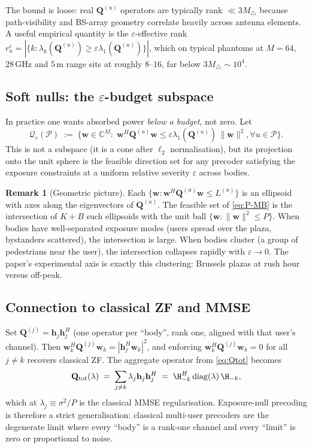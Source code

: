 \documentclass[11pt,a4paper]{article}
\theoremstyle{definition}
\newtheorem{remark}[remark]{Remark}
\newcommand{\ww}{\mathbf{w}}
\newcommand{\hh}{\mathbf{h}}
\newcommand{\Q}{\mathbf{Q}}
\newcommand{\Complex}{\mathbb{C}}
\newcommand{\Bodies}{\mathcal{P}}
\begin{document}
The bound is loose: real $\Q^{(u)}$ operators are typically rank
$\ll 3M_\triangle$ because path-visibility and BS-array geometry
correlate heavily across antenna elements. A useful empirical
quantity is the $\varepsilon$-effective rank
$r_u^\varepsilon=|\{k:\lambda_k(\Q^{(u)})\ge\varepsilon\lambda_1(\Q^{(u)})\}|$,
which on typical phantoms at $M=64$, 28\,GHz and $5\,\mathrm{m}$ range
sits at roughly $8$--$16$, far below $3M_\triangle\sim 10^4$.

\subsection{Soft nulls: the $\varepsilon$-budget subspace}

In practice one wants absorbed power \emph{below a budget}, not zero.
Let
\begin{equation}
  \mathcal{Q}_\varepsilon(\Bodies) \;:=\;
  \bigl\{\ww\in\Complex^M:\;
    \ww^H\Q^{(u)}\ww\le\varepsilon\lambda_1(\Q^{(u)})\,\|\ww\|^2,
    \forall u\in\Bodies\bigr\}.
\end{equation}
This is not a subspace (it is a cone after $\ell_2$ normalisation),
but its projection onto the unit sphere is the feasible direction set
for any precoder satisfying the exposure constraints at a uniform
relative severity $\varepsilon$ across bodies.

\begin{remark}[Geometric picture]
Each $\{\ww:\ww^H\Q^{(u)}\ww\le L^{(u)}\}$ is an ellipsoid with axes
along the eigenvectors of $\Q^{(u)}$. The feasible set of
\eqref{eq:P-MB} is the intersection of $K+B$ such ellipsoids with
the unit ball $\{\ww:\|\ww\|^2\le P\}$. When bodies have
well-separated exposure modes (users spread over the plaza, bystanders
scattered), the intersection is large. When bodies cluster (a group
of pedestrians near the user), the intersection collapses rapidly
with $\varepsilon\to 0$. The paper's experimental axis is exactly
this clustering: Brussels plazas at rush hour versus off-peak.
\end{remark}

\subsection{Connection to classical ZF and MMSE}

Set $\Q^{(j)}=\hh_j\hh_j^H$ (one operator per ``body'', rank one,
aligned with that user's channel). Then
$\ww_k^H\Q^{(j)}\ww_k=|\hh_j^H\ww_k|^2$, and enforcing
$\ww_k^H\Q^{(j)}\ww_k=0$ for all $j\ne k$ recovers classical ZF.
The aggregate operator from \eqref{eq:Qtot} becomes
\[
  \Q_{\mathrm{tot}}(\lambda)
  \;=\;\sum_{j\ne k}\lambda_j\hh_j\hh_j^H
  \;=\;\H_{-k}^H\,\mathrm{diag}(\lambda)\,\H_{-k},
\]
which at $\lambda_j\equiv\sigma^2/P$ is the classical MMSE
regularisation. Exposure-null precoding is therefore a strict
generalisation: classical multi-user precoders are the degenerate
limit where every ``body'' is a rank-one channel and every ``limit''
is zero or proportional to noise.
\end{document}
